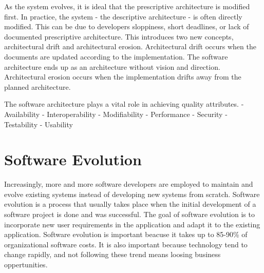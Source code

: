 As the system evolves, it is ideal that the prescriptive architecture is modified first. In practice, the system - the descriptive architecture - is often directly modified. This can be due to developers sloppiness, short deadlines, or lack of documented prescriptive architecture. This introduces two new concepts, architectural drift and architectural erosion. Architectural drift occurs when the documents are updated according to the implementation. The software architecture ends up as an architecture without vision and direction. Architectural erosion occurs when the implementation drifts away from the planned architecture. 

The software architecture plays a vital role in achieving quality attributes.
- Availability
- Interoperability
- Modifiability
- Performance
- Security
- Testability
- Usability




\section{Software Evolution}
Increasingly, more and more software developers are employed to maintain and evolve existing systems instead of developing new systems from scratch\cite{Sommerville:2011:SE}. Software evolution is a process that usually takes place when the initial development of a software project is done and was successful\cite{Bennett:2000:SME:336512.336534}. The goal of software evolution is to incorporate new user requirements in the application and adapt it to the existing application. Software evolution is important beacuse it takes up to 85-90\% of organizational software costs\cite{Sommerville:2011:SE}. It is also important because technology tend to change rapidly, and not following these trend means loosing business oppertunities.

